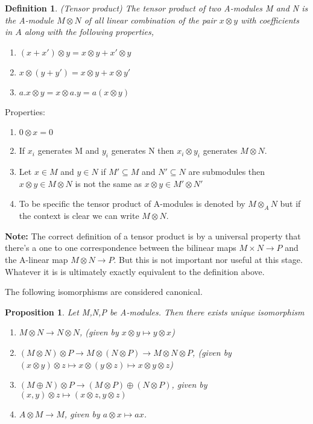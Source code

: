 \documentclass[]{report}
\newtheorem{prop}[theorem]{Proposition}
\newtheorem{defn}[theorem]{Definition}
\begin{document}
\begin{defn} (Tensor product) The tensor product of two A-modules M and N is the A-module $M\otimes N$ of all linear combination of the pair $x \otimes y$ with coefficients in $A$ along with the following properties,
    \begin{enumerate}
        \item $(x + x') \otimes y = x \otimes y + x' \otimes y$
        \item $x \otimes (y + y') = x \otimes y + x \otimes y'$
        \item $a.x \otimes y = x \otimes a.y = a(x \otimes y)$
    \end{enumerate}
\end{defn}

Properties:
\begin{enumerate}
    \item $0 \otimes x = 0$
    \item If $x_i$ generates M and $y_i$ generates N then $x_i \otimes y_i$ generates $M\otimes N$. 
    \item Let $x\in M$ and $y\in N$ if $M' \subseteq M$ and $N'\subseteq N$ are submodules then $x\otimes y \in M\otimes N$ is not the same as $x\otimes y \in M'\otimes N'$ 
    \item To be specific the tensor product of A-modules is denoted by $M \otimes_A N$ but if the context is clear we can write $M\otimes N$. 
\end{enumerate}

\textbf{Note:} The correct definition of a tensor product is by a universal property that there's a one to one correspondence between the bilinear maps $M \times N \rightarrow P$ and the A-linear map $M\otimes N\rightarrow P$. But this is not important nor useful at this stage. Whatever it is is ultimately exactly equivalent to the definition above. 

The following isomorphisms are considered canonical. 
\begin{prop}
    Let M,N,P be A-modules. Then there exists unique isomorphism
    \begin{enumerate}
        \item $M\otimes N \rightarrow N\otimes N$, (given by $x\otimes y \mapsto y\otimes x$)
        \item $(M\otimes N) \otimes P \rightarrow M\otimes (N\otimes P) \rightarrow M\otimes N\otimes P$, (given by $(x\otimes y) \otimes z \mapsto x \otimes (y\otimes z) \mapsto x\otimes y \otimes z$)
        \item $(M\oplus N) \otimes P \rightarrow (M\otimes P) \oplus (N\otimes P)$, given by $(x,y)\otimes z \mapsto (x\otimes z, y\otimes z)$
        \item $A\otimes M \rightarrow M$, given by $a\otimes x \mapsto ax$. 
    \end{enumerate}
\end{prop}
\end{document}
